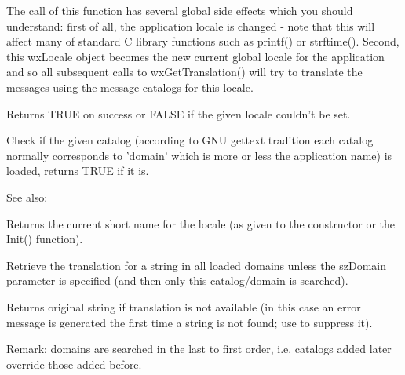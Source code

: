The call of this function has several global side effects which you should
understand: first of all, the application locale is changed - note that this
will affect many of standard C library functions such as printf() or strftime().
Second, this wxLocale object becomes the new current global locale for the
application and so all subsequent calls to wxGetTranslation() will try to
translate the messages using the message catalogs for this locale.

Returns TRUE on success or FALSE if the given locale couldn't be set.

\label{wxlocaleisloaded}


Check if the given catalog (according to GNU gettext tradition each catalog
normally corresponds to 'domain' which is more or less the application name)
is loaded, returns TRUE if it is.

See also: 

\label{wxlocalegetname}


Returns the current short name for the locale (as given to the constructor or
the Init() function).

\label{wxlocalegetstring}


Retrieve the translation for a string in all loaded domains unless the szDomain
parameter is specified (and then only this catalog/domain is searched).

Returns original string if translation is not available
(in this case an error message is generated the first time
a string is not found; use  to suppress it).

Remark: domains are searched in the last to first order, i.e. catalogs
added later override those added before.
